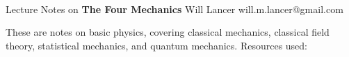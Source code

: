 \documentclass[11pt]{article}
\begin{document}
\thispagestyle{empty}
\bigskip \
\vspace{0.1cm}

\begin{center}
{\fontsize{22}{22} \selectfont Lecture Notes on}
\vskip 16pt
{\fontsize{36}{36} \selectfont \bf \sffamily The Four Mechanics}
\vskip 24pt
{\fontsize{18}{18} \selectfont \rmfamily Will Lancer} 
\vskip 6pt
{\fontsize{14}{14} \selectfont \ttfamily will.m.lancer@gmail.com} 
\vskip 24pt
\end{center}

{\parindent0pt \baselineskip=15.5pt}
\noin
These are notes on basic physics, covering classical mechanics,
classical field theory, statistical mechanics, and quantum mechanics.
Resources used:
\end{document}
